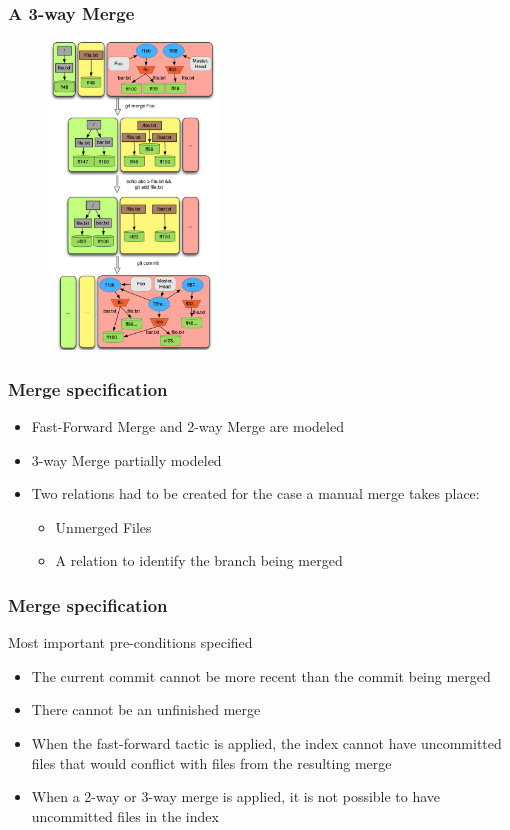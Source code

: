 \documentclass{beamer}
\begin{document}
\begin{frame}[fragile]
   \frametitle{A 3-way Merge}
   \begin{figure}
      \centering
      \includegraphics[width=0.4\textwidth]{images/merge2way.png}
   \end{figure}
\end{frame}

\begin{frame}[fragile]
	\frametitle{Merge specification}
   \normalsize
	\begin{itemize}
      \item Fast-Forward Merge and 2-way Merge are modeled
	   \item 3-way Merge partially modeled
	   \item Two relations had to be created for the case a manual
      merge takes place:
	   \begin{itemize}
		   \item Unmerged Files
		   \item A relation to identify the branch being merged
	   \end{itemize}
	\end{itemize}
\end{frame}

\begin{frame}[fragile]
	\frametitle{Merge specification}
	\begin{block}{Most important pre-conditions specified}
	\begin{itemize}
		\item The current commit cannot be more recent than the commit
		being merged
		\item There cannot be an unfinished merge
		\item When the fast-forward tactic is applied, the index cannot have
		uncommitted files that would conflict with files from the 
		resulting merge
		\item When a 2-way or 3-way merge is applied, it is not possible
		to have uncommitted files in the index
	\end{itemize}
	\end{block}


\end{frame}
\end{document}
